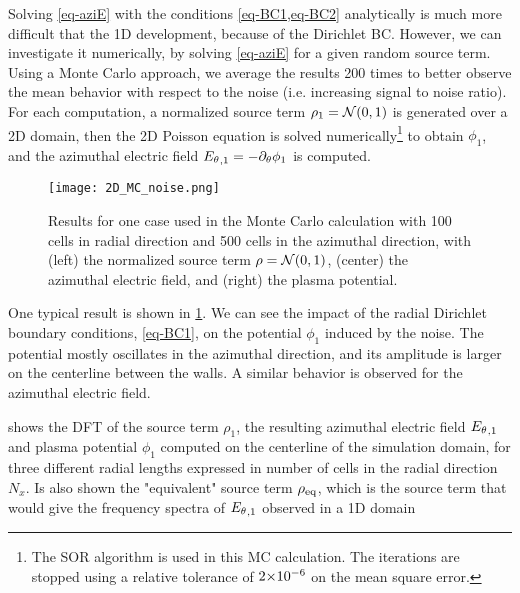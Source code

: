       Solving \cref{eq-aziE} with the conditions \cref{eq-BC1,eq-BC2} analytically is much more difficult that the \ac{1D} development, because of the Dirichlet \ac{BC}.
      However, we can investigate it numerically, by solving \cref{eq-aziE} for a given random source term.
      Using a Monte Carlo approach, we average the results  200 times to better observe the mean behavior with respect to the noise (i.e. increasing signal to noise ratio).
      For each computation, a normalized source term $\rho_1 = \mathcal{N}(0, 1)$ is generated over a \ac{2D} domain, then the \ac{2D} Poisson equation is solved numerically\footnote{The SOR algorithm is used in this MC calculation. The iterations are stopped using a relative tolerance of ${{2}{\times}10^{-6}}$ on the mean square error.} to obtain $\phi_1$, and the azimuthal electric field ${E_{\theta}}_{, 1} =- \partial_{\theta} \phi_1 $ is computed.
    
      \begin{figure}[!hbt]
        \centering
        \texttt{[image: 2D\_MC\_noise.png]}
        \caption{Results for one case used in the Monte Carlo calculation with 100 cells in radial direction and 500 cells in the azimuthal direction, with (left) the normalized source term $\rho = \mathcal{N}(0, 1)$, (center) the azimuthal electric field, and (right) the plasma potential. }
        \label{fig-one}
      \end{figure}
      
      One typical result is shown in \cref{fig-one}.
      We can see the impact of the radial Dirichlet boundary conditions, \cref{eq-BC1}, on the potential $\phi_1$ induced by the noise.
      The potential mostly oscillates in the azimuthal direction, and its amplitude is larger on the centerline between the walls.
      A similar behavior is observed for the azimuthal electric field.      
      
       shows the \ac{DFT} of the source term $\rho_1$, the resulting azimuthal electric field ${E_{\theta}}_{, 1}$ and plasma potential $\phi_1$ computed on the centerline of the simulation domain, for three different radial lengths expressed in number of cells in the radial direction $N_x$.
      Is also shown the "equivalent" source term $\rho_{\rm eq}$, which is the source term that would give the frequency spectra of ${E_{\theta}}_{, 1}$ observed in a \ac{1D} domain
      
